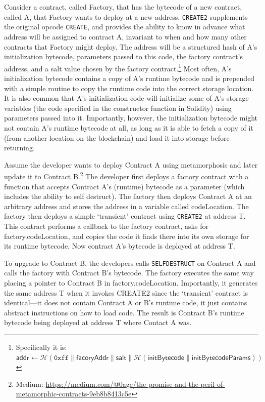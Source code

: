 Consider a contract, called Factory, that has the bytecode of a new contract, called A, that Factory wants to deploy at a new address. \texttt{CREATE2} supplements the original opcode \texttt{CREATE}, and provides the ability to know in advance what address will be assigned to contract A, invariant to when and how many other contracts that Factory might deploy. The address will be a structured hash of A's initialization bytecode, parameters passed to this code, the factory contract's address, and a salt value chosen by the factory contract.\footnote{Specifically it is: $\mathsf{addr} \leftarrow \mathcal{H}(\mathtt{0xff} \| \mathsf{facoryAddr} \| \mathsf{salt} \| \mathcal{H} (\mathsf{initBytecode} \| \mathsf{initBytecodeParams}))$} Most often, A's initialization bytecode contains a copy of A's runtime bytecode and is prepended with a simple routine to copy the runtime code into the correct storage location. It is also common that A's initialization code will initialize some of A's storage variables (\eg the code specified in the constructor function in Solidity) using parameters passed into it. Importantly, however, the initialization bytecode might not contain A's runtime bytecode at all, as long as it is able to fetch a copy of it (\eg from another location on the blockchain) and load it into storage before returning.


Assume the developer wants to deploy Contract A using metamorphosis and later update it to Contract B.\footnote{Medium: \url{https://medium.com/@0age/the-promise-and-the-peril-of-metamorphic-contracts-9eb8b8413c5e}} The developer first deploys a factory contract with a function that accepts Contract A's (runtime) bytecode as a parameter (which includes the ability to self destruct). The factory then deploys Contract A at an arbitrary address and stores the address in a variable called codeLocation. The factory then deploys a simple `transient' contract using \texttt{CREATE2} at address T. This contract performs a callback to the factory contract, asks for factory.codeLocation, and copies the code it finds there into its own storage for its runtime bytecode. Now contract A's bytecode is deployed at address T. 

To upgrade to Contract B, the developers calls \texttt{SELFDESTRUCT} on Contract A and calls the factory with Contract B's bytecode. The factory executes the same way placing a pointer to Contract B in factory.codeLocation. Importantly, it generates the same address T when it invokes CREATE2 since the `transient' contract is identical---it does not contain Contract A or B's runtime code, it just contains abstract instructions on how to load code. The result is Contract B's runtime bytecode being deployed at address T where Contact A was. 
 
